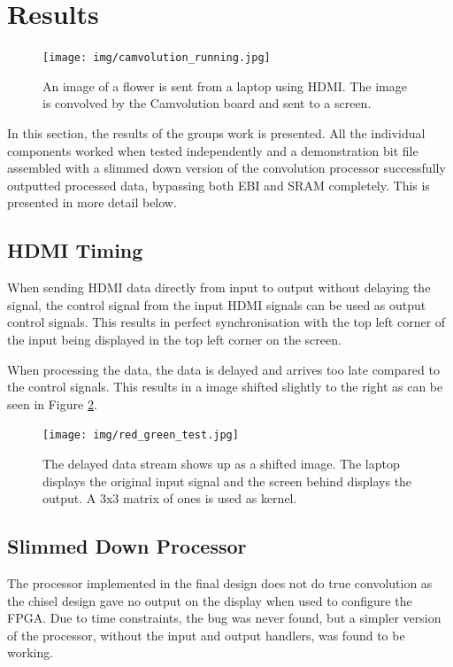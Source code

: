 \section{Results}

\begin{figure}
    \centering
    \texttt{[image: img/camvolution\_running.jpg]}
    \caption[The implemented system running]{
        An image of a flower is sent from a laptop using HDMI.
        The image is convolved by the Camvolution board and sent to a screen.
    }
    \label{fig:systemRunning}
\end{figure}

In this section, the results of the groups work is presented.
All the individual components worked when tested independently and a demonstration bit file assembled with a slimmed down version of the convolution processor successfully outputted processed data, bypassing both EBI and SRAM completely.
This is presented in more detail below.

\subsection{HDMI Timing}
When sending HDMI data directly from input to output without delaying the signal, the control signal from the input HDMI signals can be used as output control signals.
This results in perfect synchronisation with the top left corner of the input being displayed in the top left corner on the screen.

When processing the data, the data is delayed and arrives too late compared to the control signals. This results in a image shifted slightly to the right as can be seen in Figure \ref{fig:SyncDelay}.

\begin{figure}
    \centering
    \texttt{[image: img/red\_green\_test.jpg]}
    \caption[The delayed data stream]{
        The delayed data stream shows up as a shifted image.
        The laptop displays the original input signal and the screen behind displays the output.
        A 3x3 matrix of ones is used as kernel.
    }
    \label{fig:SyncDelay}
\end{figure}

\subsection{Slimmed Down Processor}
The processor implemented in the final design does not do true convolution as the chisel design gave no output on the display when used to configure the FPGA.
Due to time constraints, the bug was never found, but a simpler version of the processor, without the input and output handlers, was found to be working.

